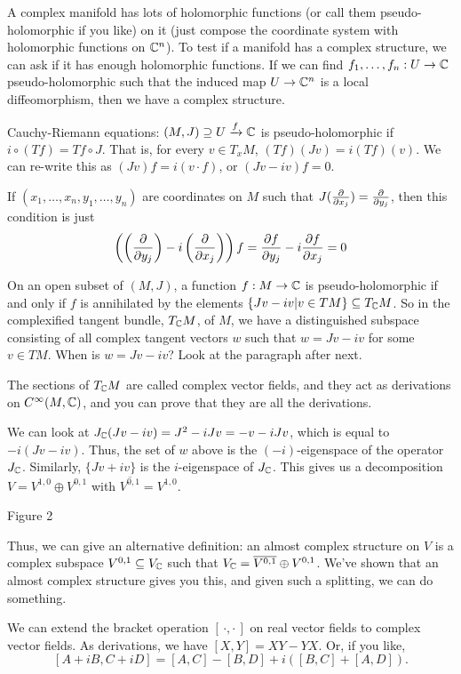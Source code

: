  A complex manifold has lots of holomorphic functions (or call
 them pseudo-holomorphic if you like) on it (just compose the
 coordinate system with holomorphic functions on $\mathbb{C}^n$).  To
 test if a manifold has a complex structure, we can ask if it has
 enough holomorphic functions.  If we can find $f_1,\dots,
 f_n:U\to \mathbb{C}$ pseudo-holomorphic such that the induced map $U\to
 \mathbb{C}^n$ is a local diffeomorphism, then we have a complex
 structure.

 Cauchy-Riemann equations: $(M,J)\supseteq U\xrightarrow{f}
 \mathbb{C}$ is pseudo-holomorphic if $i\circ (Tf) = Tf\circ J$.  That
 is, for every $v\in T_xM$, $(Tf)(Jv) = i(Tf)(v)$.  We can
 re-write this as $(Jv)f = i(v\cdot f)$, or $(Jv-iv)f=0$.

 If $(x_1,\dots, x_n,y_1,\dots, y_n)$ are coordinates on $M$ such
 that $J(\frac{\partial }{\partial x_j}) = \frac{\partial }{\partial y_j}$, then this condition is
 just
 \[
   \left(\left(\frac{\partial }{\partial y_j}\right) -
i\left(\frac{\partial }{\partial x_j}\right)\right)f = \frac{\partial f}{\partial y_j}-i\frac{\partial f}{\partial x_j}
= 0
 \]

 On an open subset of $(M,J)$, a function $f:M\to \mathbb{C}$ is
 pseudo-holomorphic if and only if $f$ is annihilated by the
 elements $\{Jv-iv|v\in TM\}\subseteq T_{\mathbb{C}} M$.  So in the
 complexified tangent bundle, $T_{\mathbb{C}} M$, of $M$, we have a distinguished
 subspace consisting of all complex tangent vectors $w$ such that
 $w=Jv-iv$ for some $v\in TM$.  When is $w=Jv-iv$? Look at the
 paragraph after next.

 The sections of $T_{\mathbb{C}} M$ are called complex vector fields, and
 they act as derivations on $C^\infty(M,\mathbb{C})$, and you can prove
 that they are all the derivations.

 We can look at $J_{\mathbb{C}}(Jv-iv) = J^2-iJv = -v-iJv$, which is equal
 to $-i(Jv-iv)$.  Thus, the set of $w$ above is the
 $(-i)$-eigenspace of the operator $J_{\mathbb{C}}$.  Similarly,
 $\{Jv+iv\}$ is the $i$-eigenspace of $J_{\mathbb{C}}$. This gives us a
 decomposition $V=V^{1,0}\oplus V^{0,1}$ with
 $\overline{V^{0,1}}=V^{1,0}$.

 Figure 2

 Thus, we can give an alternative definition: an almost complex
 structure on $V$ is a complex subspace $V^{0,1}\subseteq V_{\mathbb{C}}$ such
 that $V_{\mathbb{C}}=\overline{V^{0,1}}\oplus V^{0,1}$.  We've shown that an
 almost complex structure gives you this, and given such a
 splitting, we can do something.

 We can extend the bracket operation $[\, \cdot ,\cdot\, ]$ on real vector
 fields to complex vector fields.  As derivations, we have
 $[X,Y]=XY-YX$.  Or, if you like,
 \[
    [A+iB,C+iD] = [A,C] - [B,D] + i([B,C]+[A,D]).
 \]

